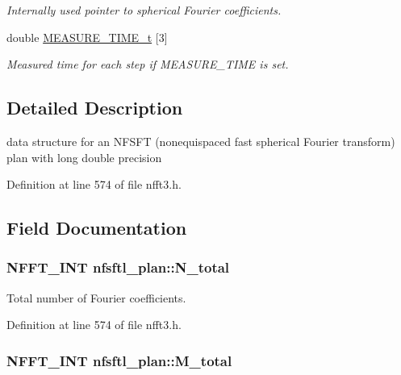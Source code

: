 \begin{DoxyCompactItemize}
\begin{DoxyCompactList}\small\item\em Internally used pointer to spherical Fourier coefficients. \end{DoxyCompactList}\item 
\hypertarget{structnfsftl__plan_ae2870ad5b902cb4724c2ab47e5e012e1}{double \hyperlink{structnfsftl__plan_ae2870ad5b902cb4724c2ab47e5e012e1}{M\-E\-A\-S\-U\-R\-E\-\_\-\-T\-I\-M\-E\-\_\-t} \mbox{[}3\mbox{]}}\label{structnfsftl__plan_ae2870ad5b902cb4724c2ab47e5e012e1}

\begin{DoxyCompactList}\small\item\em Measured time for each step if M\-E\-A\-S\-U\-R\-E\-\_\-\-T\-I\-M\-E is set. \end{DoxyCompactList}\end{DoxyCompactItemize}


\subsection{Detailed Description}
data structure for an N\-F\-S\-F\-T (nonequispaced fast spherical Fourier transform) plan with long double precision 

Definition at line 574 of file nfft3.\-h.



\subsection{Field Documentation}
\hypertarget{structnfsftl__plan_a1bfa1de211ea27da5675678e363ff1ab}{
\subsubsection[{N\-\_\-total}]{\setlength{\rightskip}{0pt plus 5cm}N\-F\-F\-T\-\_\-\-I\-N\-T nfsftl\-\_\-plan\-::\-N\-\_\-total}}\label{structnfsftl__plan_a1bfa1de211ea27da5675678e363ff1ab}


Total number of Fourier coefficients. 



Definition at line 574 of file nfft3.\-h.

\hypertarget{structnfsftl__plan_adae433d8abf67e89b1aa194db96b1ff8}{
\subsubsection[{M\-\_\-total}]{\setlength{\rightskip}{0pt plus 5cm}N\-F\-F\-T\-\_\-\-I\-N\-T nfsftl\-\_\-plan\-::\-M\-\_\-total}}\label{structnfsftl__plan_adae433d8abf67e89b1aa194db96b1ff8}


